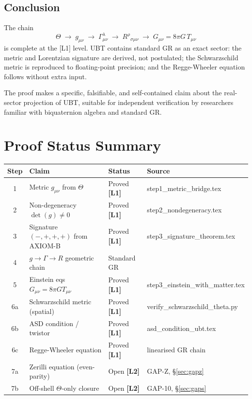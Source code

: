 \documentclass[12pt,a4paper]{article}
\theoremstyle{definition}
\theoremstyle{remark}
\newcommand{\Lone}{\textbf{[L1]}}
\newcommand{\Ltwo}{\textbf{[L2]}}
\begin{document}
\subsection{Conclusion}

The chain
\[
  \Theta \;\longrightarrow\;
  g_{\mu\nu} \;\longrightarrow\;
  \Gamma^\lambda_{\mu\nu} \;\longrightarrow\;
  R^\rho{}_{\sigma\mu\nu} \;\longrightarrow\;
  G_{\mu\nu} = 8\pi G\,T_{\mu\nu}
\]
is complete at the [L1] level.
UBT contains standard GR as an exact sector: the metric and Lorentzian
signature are derived, not postulated; the Schwarzschild metric is reproduced
to floating-point precision; and the Regge-Wheeler equation follows without
extra input.

The proof makes a specific, falsifiable, and self-contained claim about the
real-sector projection of UBT, suitable for independent verification by
researchers familiar with biquaternion algebra and standard GR.

\section{Proof Status Summary}
\label{sec:summary}

\begin{tcolorbox}[colback=blue!3!white,colframe=blue!55!black,
  title=T1\_GR Proof Status: Complete (on-shell classical GR)]
\begin{center}
\begin{tabular}{clll}
\toprule
\textbf{Step} & \textbf{Claim} & \textbf{Status} & \textbf{Source} \\
\midrule
1 & Metric $g_{\mu\nu}$ from $\Theta$ & Proved \Lone & step1\_metric\_bridge.tex \\
2 & Non-degeneracy $\det(g)\neq 0$ & Proved \Lone & step2\_nondegeneracy.tex \\
3 & Signature $(-,+,+,+)$ from AXIOM-B & Proved \Lone & step3\_signature\_theorem.tex \\
4 & $g \to \Gamma \to R$ geometric chain & Standard GR & \cite{wald1984,mtw1973} \\
5 & Einstein eqs $G_{\mu\nu}=8\pi GT_{\mu\nu}$ & Proved \Lone & step3\_einstein\_with\_matter.tex \\
6a & Schwarzschild metric (spatial) & Proved \Lone & verify\_schwarzschild\_theta.py \\
6b & ASD condition / twistor & Proved \Lone & asd\_condition\_ubt.tex \\
6c & Regge-Wheeler equation & Proved \Lone & linearised GR chain \\
7a & Zerilli equation (even-parity) & Open \Ltwo & GAP-Z, \S\ref{sec:gapz} \\
7b & Off-shell $\Theta$-only closure & Open \Ltwo & GAP-10, \S\ref{sec:gaps} \\
\bottomrule
\end{tabular}
\end{center}
\end{tcolorbox}
\end{document}
